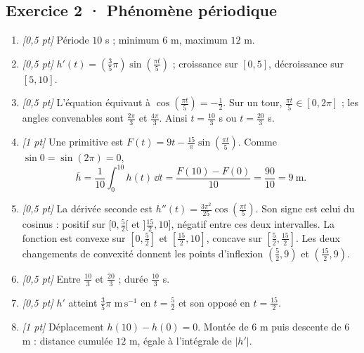 \subsection*{Exercice 2 · Phénomène périodique}\begin{enumerate}

\item \textit{[0,5 pt]} Période $10$ s ; minimum $6$ m, maximum $12$ m.

\item \textit{[0,5 pt]} $h'(t)=(\frac{3}{5}\pi)\sin (\frac{\pi t}{5})$ ; croissance sur $[0,5]$, décroissance sur $[5,10]$.

\item \textit{[0,5 pt]} L'équation équivaut à $\cos (\frac{\pi t}{5})=-\frac{1}{2}$. Sur un tour, $\frac{\pi t}{5}\in[0,2\pi]$ ; les angles convenables sont $\frac{2\pi}{3}$ et $\frac{4\pi}{3}$. Ainsi $t=\frac{10}{3}$ s ou $t=\frac{20}{3}$ s.

\item \textit{[1 pt]} Une primitive est $F(t)=9t-\frac{15}{\pi}\sin (\frac{\pi t}{5})$. Comme $\sin0=\sin(2\pi)=0$,
\[\overline h=\frac{1}{10}\int_0^{10}h(t)\,\dd t=\frac{F(10)-F(0)}{10}=\frac{90}{10}=9\ \mathrm{m}.\]

\item \textit{[0,5 pt]} La dérivée seconde est $h''(t)=\frac{3\pi^2}{25}\cos (\frac{\pi t}{5})$. Son signe est celui du cosinus : positif sur $[0,\frac{5}{2}[$ et $]\frac{15}{2},10]$, négatif entre ces deux intervalles. La fonction est convexe sur $[0,\frac{5}{2}]$ et $[\frac{15}{2},10]$, concave sur $[\frac{5}{2},\frac{15}{2}]$. Les deux changements de convexité donnent les points d'inflexion $(\frac{5}{2},9)$ et $(\frac{15}{2},9)$.

\item \textit{[0,5 pt]} Entre $\frac{10}{3}$ et $\frac{20}{3}$ ; durée $\frac{10}{3}$ s.

\item \textit{[0,5 pt]} $h'$ atteint $\frac{3}{5}\pi$ $\mathrm{m\,s^{-1}}$ en $t=\frac{5}{2}$ et son opposé en $t=\frac{15}{2}$.

\item \textit{[1 pt]} Déplacement $h(10)-h(0)=0$. Montée de $6$ m puis descente de $6$ m : distance cumulée $12$ m, égale à l'intégrale de $|h'|$.

\end{enumerate}

